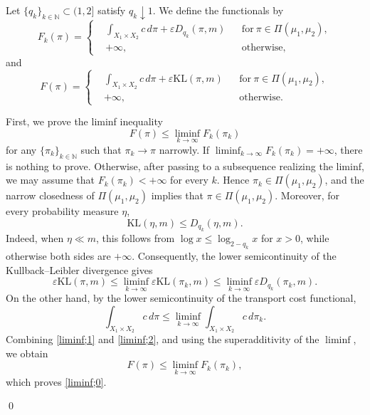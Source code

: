 \documentclass[a4paper,11pt]{article}
\theoremstyle{plain}
\theoremstyle{definition}
\theoremstyle{remark}
\theoremstyle{plain}
\newenvironment{pf}[1]
{{\noindent\textbf{Proof of #1.}}}{\hfill \qed}
\numberwithin{equation}{section}
\newcommand{\N}{\mathbb N}
\newcommand{\ep}{\varepsilon}
\newcommand{\1}{\mbox{1}\hspace{-0.25em}\mbox{l}} %
\begin{document}
\begin{pf}{Theorem \ref{thm;narrow}}
Let $\{q_k\}_{k \in \N} \subset (1,2]$ satisfy $q_k\downarrow1$. We define the functionals by
\begin{equation*}
F_k(\pi) = \left\{
\begin{aligned} &\int_{X_1 \times X_2} c\, d\pi + \ep D_{q_k}(\pi, m)
&& \mathrm{for}\ \pi \in \Pi(\mu_1, \mu_2), \\
&+ \infty, && \mathrm{otherwise},
\end{aligned}
\right.
\end{equation*}
and
\begin{equation*}
F(\pi) = \left\{
\begin{aligned}
&\int_{X_1 \times X_2} c\, d\pi + \ep \mathrm{KL}(\pi, m)
&& \mathrm{for}\ \pi \in \Pi(\mu_1, \mu_2), \\
&+ \infty, && \mathrm{otherwise}.
\end{aligned}
\right.
\end{equation*}

First, we prove the liminf inequality
\begin{equation}\label{liminf;0}
  F(\pi)
  \leq \liminf_{k \to \infty} F_k(\pi_k)
\end{equation}
for any $\{\pi_k\}_{k \in \N}$ such that $\pi_k \to \pi$ narrowly. If $\displaystyle \liminf_{k\to\infty}F_k(\pi_k)=+\infty$, there is nothing to prove. Otherwise, after passing to a subsequence realizing the liminf, we may assume that $F_k(\pi_k)<+\infty$ for every $k$. Hence $\pi_k\in\Pi(\mu_1,\mu_2)$, and the narrow closedness of $\Pi(\mu_1,\mu_2)$ implies that $\pi\in\Pi(\mu_1,\mu_2)$. Moreover, for every probability measure $\eta$,
\begin{equation*}
\mathrm{KL}(\eta,m) \leq D_{q_k}(\eta,m).
\end{equation*}
Indeed, when $\eta \ll m$, this follows from $\log x\leq\log_{2-q_k}x$ for $x>0$, while otherwise both sides are $+\infty$. Consequently, the lower semicontinuity of the Kullback--Leibler divergence gives
\begin{equation}\label{liminf;1}
  \ep \mathrm{KL}(\pi, m)
  \leq \liminf_{k \to \infty} \ep \mathrm{KL}(\pi_k, m)
  \leq \liminf_{k \to \infty} \ep D_{q_k}(\pi_k, m).
\end{equation}
On the other hand, by the lower semicontinuity of the transport cost functional,
\begin{equation}\label{liminf;2}
\int_{X_1 \times X_2} c\, d\pi \leq \liminf_{k \to \infty} \int_{X_1 \times X_2} c\, d\pi_k.
\end{equation}
Combining \eqref{liminf;1} and \eqref{liminf;2}, and using the superadditivity of the $\liminf$, we obtain
\begin{equation*}
F(\pi) \leq \liminf_{k\to\infty} F_k(\pi_k),
\end{equation*}
which proves \eqref{liminf;0}.


\end{pf}
\end{document}
